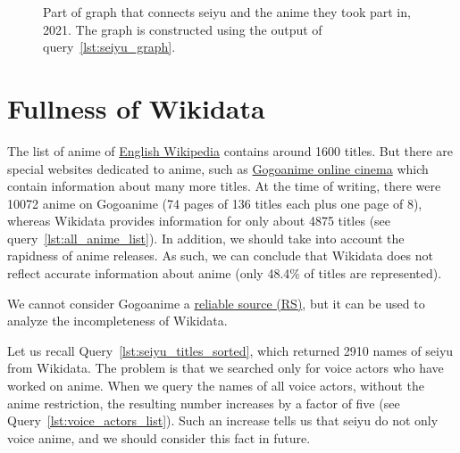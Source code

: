 \begin{figure*}

    \setlength{\fboxsep}{0pt}%
    \setlength{\fboxrule}{1pt}%
	\caption[Part of graph that connects seiyu to anime they have voiced, 2021.]{Part of graph that connects seiyu and the anime they took part in, 2021. The graph is constructed using the output of query~\ref{lst:seiyu_graph}.}%
    \label{fig:Seiyu_graph_en}%
\end{figure*} 

\section{Fullness of Wikidata}

The list of anime of \href{https://w.wiki/4Xs4}{English Wikipedia} contains around \num{1600} titles. But there are special websites dedicated to anime, such as \href{https://www1.gogoanime.cm/}{Gogoanime online cinema} which contain information about many more titles. At the time of writing, there were \num{10072} anime on Gogoanime (\num{74} pages of \num{136} titles each plus one page of \num{8}), whereas Wikidata provides information for only about \num{4875} titles (see query~\ref{lst:all_anime_list}). In addition, we should take into account the rapidness of anime releases. As such, we can conclude that Wikidata does not reflect accurate information about anime (only \num{48.4}\% of titles are represented).

We cannot consider Gogoanime a \href{https://w.wiki/Eiw}{reliable source (RS)}, but it can be used to analyze the incompleteness of Wikidata.

Let us recall Query~\protect\ref{lst:seiyu_titles_sorted}, which returned \num{2910} names of seiyu from Wikidata. The problem is that we searched only for voice actors who have worked on anime. When we query the names of all voice actors, without the anime restriction, the resulting number increases by a factor of five (see Query~\protect\ref{lst:voice_actors_list}). Such an increase tells us that seiyu do not only voice anime, and we should consider this fact in  future.

